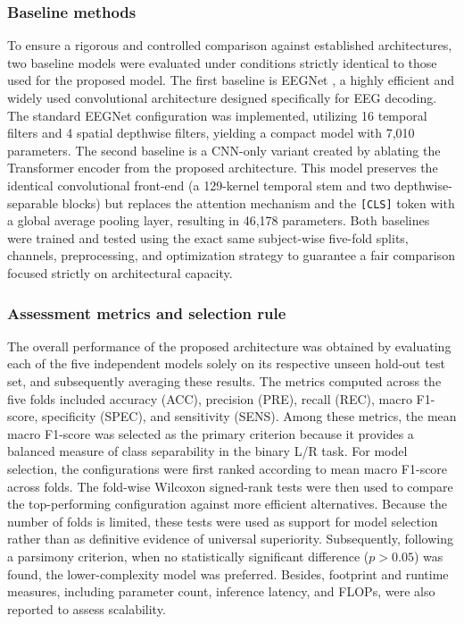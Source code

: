 \documentclass[a4paper,fleqn]{cas-dc}
\begin{document}
\subsubsection{Baseline methods}
To ensure a rigorous and controlled comparison against established architectures, two baseline models were evaluated under conditions strictly identical to those used for the proposed model. The first baseline is EEGNet \citep{lawhern2018eegnet}, a highly efficient and widely used convolutional architecture designed specifically for EEG decoding. The standard EEGNet configuration was implemented, utilizing 16 temporal filters and 4 spatial depthwise filters, yielding a compact model with 7,010 parameters. The second baseline is a CNN-only variant created by ablating the Transformer encoder from the proposed architecture. This model preserves the identical convolutional front-end (a 129-kernel temporal stem and two depthwise-separable blocks) but replaces the attention mechanism and the \texttt{[CLS]} token with a global average pooling layer, resulting in 46,178 parameters. Both baselines were trained and tested using the exact same subject-wise five-fold splits, channels, preprocessing, and optimization strategy to guarantee a fair comparison focused strictly on architectural capacity.

\subsubsection{Assessment metrics and selection rule}
\label{model_selection_rule}
The overall performance of the proposed architecture was obtained by evaluating each of the five independent models solely on its respective unseen hold-out test set, and subsequently averaging these results. The metrics computed across the five folds included accuracy (ACC), precision (PRE), recall (REC), macro F1-score, specificity (SPEC), and sensitivity (SENS). Among these metrics, the mean macro F1-score was selected as the primary criterion because it provides a balanced measure of class separability in the binary L/R task. For model selection, the configurations were first ranked according to mean macro F1-score across folds. The fold-wise Wilcoxon signed-rank tests were then used to compare the top-performing configuration against more efficient alternatives. Because the number of folds is limited, these tests were used as support for model selection rather than as definitive evidence of universal superiority. Subsequently, following a parsimony criterion, when no statistically significant difference ($p>0.05$) was found, the lower-complexity model was preferred. Besides, footprint and runtime measures, including parameter count, inference latency, and FLOPs, were also reported to assess scalability.
\end{document}
